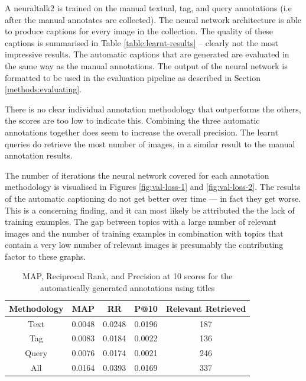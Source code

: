 \FloatBarrier

A neuraltalk2 is trained on the manual textual, tag, and query annotations (i.e after the manual annotates are collected). The neural network architecture is able to produce captions for every image in the collection. The quality of these captions is summarised in Table \ref{table:learnt-results} -- clearly not the most impressive results. The automatic captions that are generated are evaluated in the same way as the manual annotations. The output of the neural network is formatted to be used in the evaluation pipeline as described in Section \ref{methods:evaluating}. 

There is no clear individual annotation methodology that outperforms the others, the scores are too low to indicate this. Combining the three automatic annotations together does seem to increase the overall precision. The learnt queries do retrieve the most number of images, in a similar result to the manual annotation results.

The number of iterations the neural network covered for each annotation methodology is visualised in Figures \ref{fig:val-loss-1} and \ref{fig:val-loss-2}. The results of the automatic captioning do not get better over time --- in fact they get worse. This is a concerning finding, and it can most likely be attributed the the lack of training examples. The gap between topics with a large number of relevant images and the number of training examples in combination with topics that contain a very low number of relevant images is presumably the contributing factor to these graphs.

\begin{table}[ht]
    \centering
    \begin{tabular}{|c|c|c|c|c|}
        \hline
         Methodology & MAP & RR & P@10 & Relevant Retrieved\\ \hline
         Text & 0.0048 & 0.0248 & 0.0196 & 187 \\ \hline
         Tag & 0.0083 & 0.0184 & 0.0022 & 136 \\ \hline
         Query & 0.0076 & 0.0174 & 0.0021 & 246 \\ \hline
         All & 0.0164 & 0.0393 & 0.0169 & 337 \\ \hline
    \end{tabular}
    \caption{MAP, Reciprocal Rank, and Precision at 10 scores for the automatically generated annotations using titles}
    \label{table:learnt-results-title}
\end{table}


